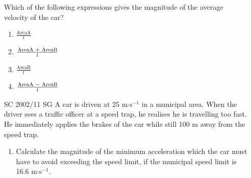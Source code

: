 \begin{enumerate}[noitemsep, label=\textbf{\arabic*}. ]
\begin{figure}[H]
\begin{center}
      \vspace{2pt}
    \vspace{.1in}
    
    \end{center}

 \end{figure}   

    \addtocounter{footnote}{-0}
    
Which of the following expressions gives the magnitude of the average velocity of the car?
\label{m38796*id82337}\begin{enumerate}[noitemsep, label=\textbf{\alph*}. ] 
            \label{m38796*uid213}\item \begin{math}\frac{\mathrm{Area}\mathrm{A}}{t}\end{math}\label{m38796*uid214}\item \begin{math}\frac{\mathrm{Area}\mathrm{A}\phantom{\rule{0.277778em}{0ex}}+\phantom{\rule{0.277778em}{0ex}}\mathrm{Area}\mathrm{B}}{t}\end{math}\label{m38796*uid215}\item \begin{math}\frac{\mathrm{Area}\mathrm{B}}{t}\end{math}\label{m38796*uid216}\item \begin{math}\frac{\mathrm{Area}\mathrm{A}\phantom{\rule{0.277778em}{0ex}}-\phantom{\rule{0.277778em}{0ex}}\mathrm{Area}\mathrm{B}}{t}\end{math}\end{enumerate}
                \label{m38796*uid217}\item [SC 2002/11 SG] A car is driven at 25 m\begin{math}\ensuremath{\cdot}\end{math}s\begin{math}{}^{-1}\end{math} in a municipal area. When the driver sees a traffic officer at a speed trap, he realises he is travelling too fast. He immediately applies the brakes of the car while still 100 m away from the speed trap.
\label{m38796*id82530}\begin{enumerate}[noitemsep, label=\textbf{\alph*}. ] 
            \label{m38796*uid218}\item Calculate the magnitude of the minimum acceleration which the car must have to avoid exceeding the speed limit, if the municipal speed limit is 16.6 m\begin{math}\ensuremath{\cdot}\end{math}s\begin{math}{}^{-1}\end{math}.

\end{enumerate}
\end{enumerate}
